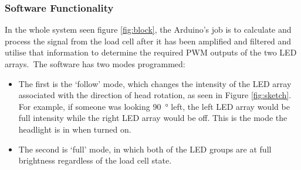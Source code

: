 \documentclass[twoside]{article}
\begin{document}
        \subsubsection{Software Functionality}
            In the whole system seen figure \ref{fig:block}, the Arduino's job is to calculate and process the signal from the load cell after it has been amplified and filtered and utilise that information to determine the required PWM outputs of the two LED arrays.  
            The software has two modes programmed:
            \begin{itemize}
                \item The first is the `follow' mode, which changes the intensity of the LED array associated with the direction of head rotation, as seen in Figure \ref{fig:sketch}. For example, if someone was looking \SI{90}{\degree} left, the left LED array would be full intensity while the right LED array would be off. This is the mode the headlight is in when turned on.
                \item The second is `full' mode, in which both of the LED groups are at full brightness regardless of the load cell state. 
            \end{itemize}
\end{document}
